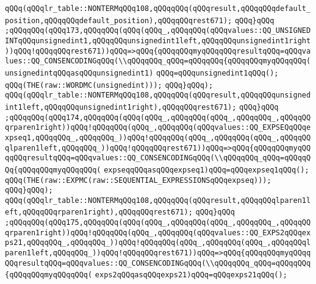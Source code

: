 \verb|qQQq(qQQqlr_table::NONTERMqQQq108,qQQqqQQq(qQQqresult,qQQqqQQqdefault_position,qQQqqQQqdefault_position),qQQqqQQqrest671);|\newline
\verb|qQQq}qQQq|\newline
\verb|;qQQqqQQq(qQQq173,qQQqqQQq(qQQq(qQQq_,qQQqqQQq(qQQqvalues::QQ_UNSIGNEDINTqQQqunsignedint1,qQQqqQQqunsignedint1left,qQQqqQQqunsignedint1right))qQQq!qQQqqQQqrest671))qQQq=>qQQq{qQQqqQQqmyqQQqqQQqresultqQQq=qQQqvalues::QQ_CONSENCODINGqQQq(\\qQQqqQQq_qQQq=qQQqqQQq{qQQqqQQqmyqQQqqQQq(unsignedintqQQqasqQQqunsignedint1)|\newline
\verb|qQQq=qQQqunsignedint1qQQq();|\newline
\verb|qQQq(THE(raw::WORDMC(unsignedint)));|\newline
\verb|qQQq}qQQq);|\newline
\verb|qQQq(qQQqlr_table::NONTERMqQQq108,qQQqqQQq(qQQqresult,qQQqqQQqunsignedint1left,qQQqqQQqunsignedint1right),qQQqqQQqrest671);|\newline
\verb|qQQq}qQQq|\newline
\verb|;qQQqqQQq(qQQq174,qQQqqQQq(qQQq(qQQq_,qQQqqQQq(qQQq_,qQQqqQQq_,qQQqqQQqrparen1right))qQQq!qQQqqQQq(qQQq_,qQQqqQQq(qQQqvalues::QQ_EXPSEQqQQqexpseq1,qQQqqQQq_,qQQqqQQq_))qQQq!qQQqqQQq(qQQq_,qQQqqQQq(qQQq_,qQQqqQQqlparen1left,qQQqqQQq_))qQQq!qQQqqQQqrest671))qQQq=>qQQq{qQQqqQQqmyqQQqqQQqresultqQQq=qQQqvalues::QQ_CONSENCODINGqQQq(\\qQQqqQQq_qQQq=qQQqqQQq{qQQqqQQqmyqQQqqQQq(|\newline
\verb|expseqqQQqasqQQqexpseq1)qQQq=qQQqexpseq1qQQq();|\newline
\verb|qQQq(THE(raw::EXPMC(raw::SEQUENTIAL_EXPRESSIONSqQQqexpseq)));|\newline
\verb|qQQq}qQQq);|\newline
\verb|qQQq(qQQqlr_table::NONTERMqQQq108,qQQqqQQq(qQQqresult,qQQqqQQqlparen1left,qQQqqQQqrparen1right),qQQqqQQqrest671);|\newline
\verb|qQQq}qQQq|\newline
\verb|;qQQqqQQq(qQQq175,qQQqqQQq(qQQq(qQQq_,qQQqqQQq(qQQq_,qQQqqQQq_,qQQqqQQqrparen1right))qQQq!qQQqqQQq(qQQq_,qQQqqQQq(qQQqvalues::QQ_EXPS2qQQqexps21,qQQqqQQq_,qQQqqQQq_))qQQq!qQQqqQQq(qQQq_,qQQqqQQq(qQQq_,qQQqqQQqlparen1left,qQQqqQQq_))qQQq!qQQqqQQqrest671))qQQq=>qQQq{qQQqqQQqmyqQQqqQQqresultqQQq=qQQqvalues::QQ_CONSENCODINGqQQq(\\qQQqqQQq_qQQq=qQQqqQQq{qQQqqQQqmyqQQqqQQq(|\newline
\verb|exps2qQQqasqQQqexps21)qQQq=qQQqexps21qQQq();|\newline
